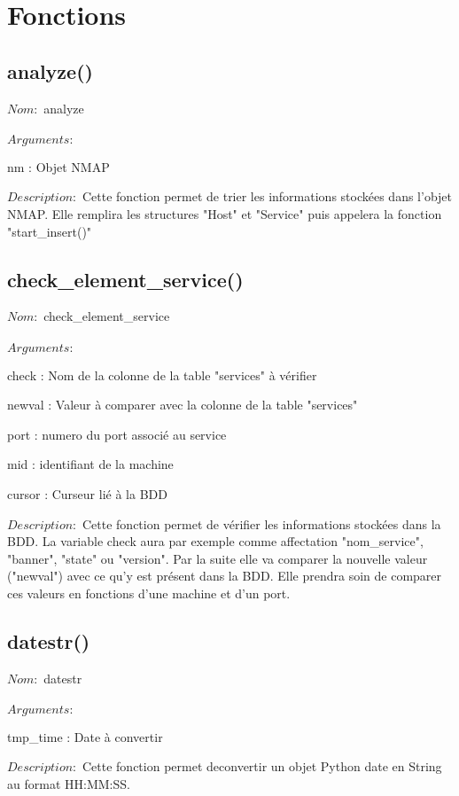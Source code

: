 \documentclass[12pt]{report}
\begin{document}
	\chapter{Fonctions}
		\section{analyze()}
			{\setlength{\parindent}{0cm}
			$Nom :$ analyze\\\\
			}
			$Arguments :$
			\begin{description}
				\item nm : Objet NMAP
			\end{description}
			$Description : $ Cette fonction permet de trier les informations stockées dans l'objet NMAP. Elle remplira les structures "Host" et "Service" puis appelera la fonction "start\_insert()"
		\section{check\_element\_service()}
			{\setlength{\parindent}{0cm}
			$Nom :$ check\_element\_service\\\\
			}
			$Arguments :$
			\begin{description}
				\item check : Nom de la colonne de la table "services" à vérifier
				\item newval : Valeur à comparer avec la colonne de la table "services"
				\item port : numero du port associé au service
				\item mid : identifiant de la machine
				\item cursor : Curseur lié à la BDD\\
			\end{description}
			$Description : $ Cette fonction permet de vérifier les informations stockées dans la BDD. La variable check aura par exemple comme affectation "nom\_service", "banner", "state" ou "version". Par la suite elle va comparer la nouvelle valeur ("newval") avec ce qu'y est présent dans la BDD.  Elle prendra soin de comparer ces valeurs en fonctions d'une machine et d'un port.
		\section{datestr()}
			{\setlength{\parindent}{0cm}
			$Nom :$ datestr\\\\
			}
			$Arguments :$
			\begin{description}
				\item tmp\_time : Date à convertir
			\end{description}
			$Description : $ Cette fonction permet deconvertir un objet Python date en String au format HH:MM:SS.
\end{document}
